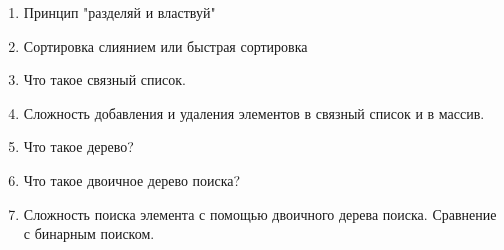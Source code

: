 \documentclass{article}
\begin{document}
\begin{enumerate}
\item Принцип "разделяй и властвуй"
\item Сортировка слиянием или быстрая сортировка
\item Что такое связный список.
\item Сложность добавления и удаления элементов в связный список и в массив.
\item Что такое дерево?
\item Что такое двоичное дерево поиска? 
\item Сложность поиска элемента с помощью двоичного дерева поиска. Сравнение с бинарным поиском.





\end{enumerate}
\end{document}
